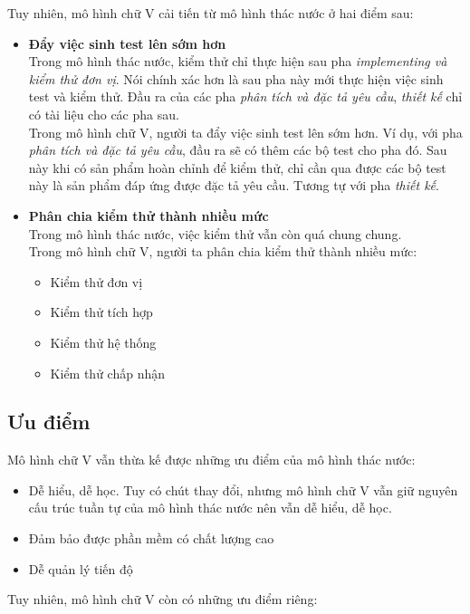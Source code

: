 \documentclass[14pt]{extarticle}
\begin{document}
Tuy nhiên, mô hình chữ V cải tiến
từ mô hình thác nước ở hai điểm sau:
\begin{itemize}
  \item \textbf{Đẩy việc sinh test lên sớm hơn}\\
        Trong mô hình thác nước, kiểm thử chỉ thực hiện sau pha \textit{implementing
          và kiểm thử đơn vị}. Nói chính xác hơn là sau pha này mới thực hiện
        việc sinh test và kiểm thử. Đầu ra của các pha \textit{phân tích và đặc tả
          yêu cầu}, \textit{thiết kế} chỉ có tài liệu cho các pha sau. \\
        Trong mô hình chữ V, người ta đẩy việc sinh test lên sớm hơn. Ví dụ,
        với pha \textit{phân tích và đặc tả yêu cầu}, đầu ra sẽ có thêm các bộ test
        cho pha đó. Sau này khi có sản phẩm hoàn chỉnh để kiểm thử, chỉ
        cần qua được các bộ test này là sản phẩm đáp ứng được đặc tả yêu cầu.
        Tương tự với pha \textit{thiết kế}.

  \item \textbf{Phân chia kiểm thử thành nhiều mức}\\
        Trong mô hình thác nước, việc kiểm thử vẫn còn quá chung chung.\\
        Trong mô hình chữ V, người ta phân chia kiểm thử thành nhiều mức:
        \begin{itemize}
          \item Kiểm thử đơn vị
          \item Kiểm thử tích hợp
          \item Kiểm thử hệ thống
          \item Kiểm thử chấp nhận
        \end{itemize}

\end{itemize}

\subsection{Ưu điểm}
Mô hình chữ V vẫn thừa kế được những ưu điểm của mô hình thác nước:
\begin{itemize}
  \item Dễ hiểu, dễ học. Tuy có chút thay đổi, nhưng mô hình chữ V vẫn
        giữ nguyên cấu trúc tuần tự của mô hình thác nước nên vẫn dễ hiểu, dễ học.

  \item Đảm bảo được phần mềm có chất lượng cao
  \item Dễ quản lý tiến độ
\end{itemize}
Tuy nhiên, mô hình chữ V còn có những ưu điểm riêng:
\end{document}
